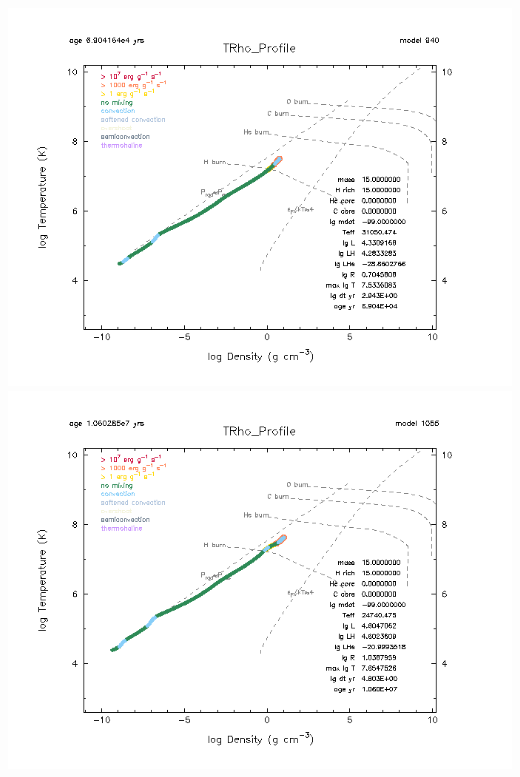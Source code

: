 \documentclass[12pt]{article}
\begin{document}
\begin{center}
\includegraphics[scale=.6]{trho_pre.png}
\includegraphics[scale=.6]{trho_post.png}
\end{center}
\end{document}
